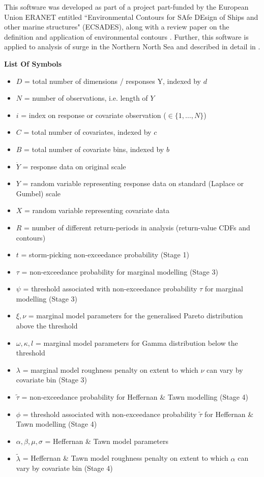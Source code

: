 \documentclass[a4paper,10pt]{article}
\begin{document}
This software was developed as part of a project part-funded by the European Union ERANET entitled “Environmental Contours for SAfe DEsign
of Ships and other marine structures" (ECSADES), along with a review paper on the definition and application of environmental contours \citep{RssOE19}. Further, this software is applied to analysis of surge in the Northern North Sea and described in detail in \cite{RssEA17b}. 

\noindent\textbf{List Of Symbols}
\begin{itemize}
	\item $D$ = total number of dimensions / responses Y, indexed by $d$
	\item $N$ = number of observations, i.e. length of $Y$
	\item $i$ = index on response or covariate observation ($\in \{1,\ldots,N\}$) 
	\item $C$ = total number of covariates, indexed by $c$
	\item $B$ = total number of covariate bins, indexed by $b$
	\item $\dot{Y}$ = response data on original scale
	\item $Y$ = random variable representing response data on standard (Laplace or Gumbel) scale
	\item $X$ = random variable representing covariate data 
	\item $R$ = number of different return-periods in analysis (return-value CDFs and contours)
	\item $t$ = storm-picking non-exceedance probability (Stage 1)
	\item $\tau$ = non-exceedance probability for marginal modelling (Stage 3)
	\item $\psi$ = threshold associated with non-exceedance probability $\tau$ for marginal modelling (Stage 3)
	\item $\xi, \nu$ = marginal model parameters for the generalised Pareto distribution above the threshold 
	\item $\omega, \kappa, l$ = marginal model parameters for Gamma distribution below the threshold
	\item $\lambda$ = marginal model roughness penalty on extent to which $\nu$ can vary by covariate bin (Stage 3)
	\item $\tilde{\tau}$ = non-exceedance probability for Heffernan \& Tawn modelling (Stage 4)
	\item $\phi$ = threshold associated with non-exceedance probability  $\tilde{\tau}$ for Heffernan \& Tawn modelling (Stage 4)
	\item $\alpha, \beta, \mu, \sigma$ = Heffernan \& Tawn model parameters
	\item $\tilde{\lambda}$  = Heffernan \& Tawn model roughness penalty on extent to which $\alpha$ can vary by covariate bin (Stage 4)
\end{itemize}
\end{document}
